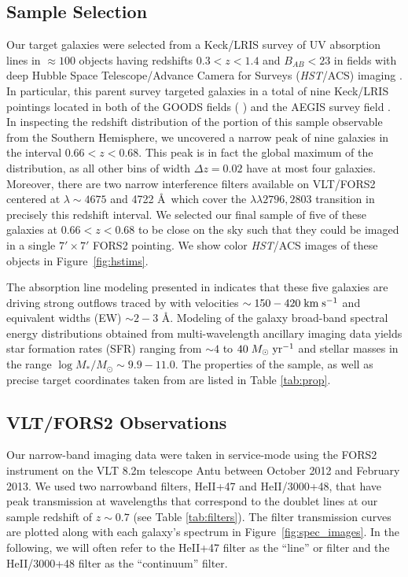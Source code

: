\documentclass[twocolumn]{aastex61}
\def \mkms {{\rm \; km\;s^{-1}}}
\def \msunperyr {{\; M_{\odot}\rm \;yr^{-1}}}
\begin{document}
\subsection{Sample Selection}
Our target galaxies were selected from a Keck/LRIS survey of UV absorption lines in $\approx 100$ objects having redshifts $0.3< z < 1.4$ and $B_{AB}< 23$ in fields with deep Hubble Space Telescope/Advance Camera for Surveys (\emph{HST}/ACS) imaging \citep{Rubin_2014}.  In particular, this parent survey targeted galaxies in a total of nine Keck/LRIS pointings located in both of the GOODS fields (\citeauthor{Giavalisco2004} \citeyear{Giavalisco2004}) and the AEGIS survey field \citep[the Extended Groth Strip;][]{Davis2007}.  In inspecting the redshift distribution of the portion of this sample observable from the Southern Hemisphere, we uncovered a narrow peak of nine galaxies in the interval $0.66 < z < 0.68$.  This peak is in fact the global maximum of the distribution, as all other bins of width $\Delta z = 0.02$ have at most four galaxies.  Moreover, there are two narrow interference filters available on VLT/FORS2 centered at $\lambda \sim 4675$ and 4722 \AA\ which cover the  $\lambda \lambda 2796, 2803$ transition in precisely this redshift interval.  We selected our final sample of five of these galaxies at $0.66 < z < 0.68$ to be close on the sky such that they could be imaged in a single $7' \times 7' $ FORS2 pointing.  
We show color {\it HST}/ACS images of these objects in Figure~\ref{fig:hstims}.

The absorption line modeling presented in \cite{Rubin_2014} indicates that these five galaxies are driving strong outflows traced by   with velocities $\sim150-420\mkms$ and equivalent widths (EW) $\sim 2-3$ \AA.  Modeling of the galaxy broad-band spectral energy distributions obtained from multi-wavelength ancillary imaging data yields star formation rates (SFR) ranging from $\sim4$ to $40\msunperyr$ and stellar masses in the range $\log M_*/M_{\odot}\sim 9.9-11.0$. The properties of the sample, as well as precise target coordinates taken from \cite{Rubin_2014} are listed in Table \ref{tab:prop}. 


\subsection{VLT/FORS2 Observations}
Our narrow-band imaging data were taken in service-mode using the FORS2 instrument on the VLT 8.2m telescope Antu between October 2012 and February 2013. 
We used two narrowband filters, HeII+47 and HeII/3000+48, that have peak transmission at wavelengths that correspond to the  doublet lines at our sample redshift of $z\sim0.7$ (see Table \ref{tab:filters}). The filter transmission curves are plotted along with each galaxy's spectrum in Figure~\ref{fig:spec_images}.
In the following, we will often refer to the HeII+47 filter as the ``line'' or  filter and the HeII/3000+48 filter as the ``continuum'' filter.
\end{document}
